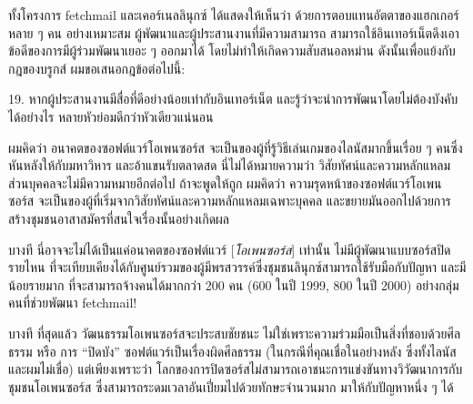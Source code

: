 ทั้งโครงการ fetchmail และเคอร์เนลลินุกซ์ ได้แสดงให้เห็นว่า
ด้วยการตอบแทนอัตตาของแฮกเกอร์หลาย ๆ  คน อย่างเหมาะสม
ผู้พัฒนาและผู้ประสานงานที่มีความสามารถ
สามารถใช้อินเทอร์เน็ตดึงเอาข้อดีของการมีผู้ร่วมพัฒนาเยอะ ๆ  ออกมาได้
โดยไม่ทำให้เกิดความสับสนอลหม่าน ดังนั้นเพื่อแย้งกับกฎของบรูกส์
ผมขอเสนอกฎข้อต่อไปนี้:

\begin{fancyquotes}
  19. หากผู้ประสานงานมีสื่อที่ดีอย่างน้อยเท่ากับอินเทอร์เน็ต
  และรู้ว่าจะนำการพัฒนาโดยไม่ต้องบังคับได้อย่างไร
  หลายหัวย่อมดีกว่าหัวเดียวแน่นอน
\end{fancyquotes}

ผมคิดว่า อนาคตของซอฟต์แวร์โอเพนซอร์ส
จะเป็นของผู้ที่รู้วิธีเล่นเกมของไลนัสมากขึ้นเรื่อย ๆ
คนซึ่งหันหลังให้กับมหาวิหาร และอ้าแขนรับตลาดสด นี่ไม่ได้หมายความว่า
วิสัยทัศน์และความหลักแหลมส่วนบุคคลจะไม่มีความหมายอีกต่อไป ถ้าจะพูดให้ถูก
ผมคิดว่า ความรุดหน้าของซอฟต์แวร์โอเพนซอร์ส
จะเป็นของผู้ที่เริ่มจากวิสัยทัศน์และความหลักแหลมเฉพาะบุคคล
และขยายมันออกไปด้วยการสร้างชุมชนอาสาสมัครที่สนใจเรื่องนั้นอย่างเกิดผล

บางที นี่อาจจะไม่ได้เป็นแค่อนาคตของซอฟต์แวร์ {[}\emph{โอเพนซอร์ส}{]}
เท่านั้น ไม่มีผู้พัฒนาแบบซอร์สปิดรายไหน
ที่จะเทียบเคียงได้กับศูนย์รวมของผู้มีพรสวรรค์ซึ่งชุมชนลินุกซ์สามารถใช้รับมือกับปัญหา
และมีน้อยรายมาก ที่จะสามารถจ้างคนได้มากกว่า 200 คน (600 ในปี 1999, 800
ในปี 2000) อย่างกลุ่มคนที่ช่วยพัฒนา fetchmail!

บางที ที่สุดแล้ว วัฒนธรรมโอเพนซอร์สจะประสบชัยชนะ
ไม่ใช่เพราะความร่วมมือเป็นสิ่งที่ชอบด้วยศีลธรรม หรือ การ ``ปิดบัง''
ซอฟต์แวร์เป็นเรื่องผิดศีลธรรม (ในกรณีที่คุณเชื่อในอย่างหลัง
ซึ่งทั้งไลนัสและผมไม่เชื่อ) แต่เพียงเพราะว่า
โลกของการปิดซอร์สไม่สามารถเอาชนะการแข่งขันทางวิวัฒนาการกับชุมชนโอเพนซอร์ส
ซึ่งสามารถระดมเวลาอันเปี่ยมไปด้วยทักษะจำนวนมาก มาให้กับปัญหาหนึ่ง ๆ  ได้